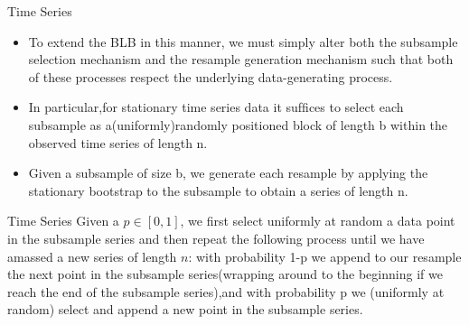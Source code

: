 \documentclass[12pt]{beamer}
\begin{document}
\begin{frame}{Time Series}
\begin{itemize}
\item To extend the BLB in this manner, we must simply alter both the subsample selection mechanism and the resample generation mechanism such that both of these processes respect the underlying data-generating process.
\item In particular,for stationary time series data it sufﬁces to select each subsample as a(uniformly)randomly positioned block of length b within the observed time series of length n. 
\item Given a subsample of size b, we generate each resample by applying the stationary bootstrap to the subsample to obtain a series of length n. 
\end{itemize}
\end{frame}
 
 
\begin{frame}{Time Series}
 Given a $p\in [0,1]$, we ﬁrst select uniformly at random a data point in the subsample series and then repeat the following process until we have amassed a new series of length $n$:   with probability 1-p we append to our resample the next point in the subsample  series(wrapping around to the beginning if we reach the end of the subsample series),and with probability p we (uniformly at random) select and append a new point in the subsample series. 
\end{frame}
\end{document}

